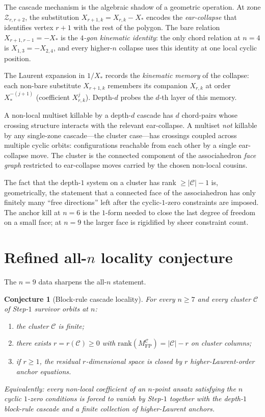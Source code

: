 \documentclass[11pt]{article}
\newtheorem{conj}[thm]{Conjecture}
\theoremstyle{definition}
\begin{document}
The cascade mechanism is the algebraic shadow of a geometric
operation. At zone $\mathcal Z_{r,r+2}$, the substitution
$X_{r+1,k}=X_{r,k}-X_*$ encodes the \emph{ear-collapse} that
identifies vertex $r{+}1$ with the rest of the polygon. The bare
relation $X_{r+1,r-1}=-X_*$ is the \emph{$4$-gon kinematic
identity}: the only chord relation at $n=4$ is $X_{1,3}=-X_{2,4}$,
and every higher-$n$ collapse uses this identity at one local
cyclic position.

The Laurent expansion in $1/X_*$ records the \emph{kinematic
memory} of the collapse: each non-bare substitute $X_{r+1,k}$
remembers its companion $X_{r,k}$ at order $X_*^{-(j+1)}$
(coefficient $X_{r,k}^{j}$). Depth-$d$ probes the $d$-th layer of
this memory.

A non-local multiset killable by a depth-$d$ cascade has $d$
chord-pairs whose crossing structure interacts with the relevant
ear-collapse. A multiset \emph{not} killable by any single-zone
cascade---the cluster case---has crossings coupled across multiple
cyclic orbits: configurations reachable from each other by a
single ear-collapse move. The cluster is the connected component
of the associahedron \emph{face graph} restricted to ear-collapse
moves carried by the chosen non-local cousins.

The fact that the depth-$1$ system on a cluster has rank
$\ge|\mathcal C|-1$ is, geometrically, the statement that a
connected face of the associahedron has only finitely many
``free directions'' left after the cyclic-$1$-zero constraints are
imposed. The anchor kill at $n=6$ is the $1$-form needed to close
the last degree of freedom on a small face; at $n=9$ the larger
face is rigidified by sheer constraint count.

\section{Refined all-$n$ locality conjecture}\label{sec:conj}

The $n=9$ data sharpens the all-$n$ statement.

\begin{conj}[Block-rule cascade locality]\label{conj:blockrule}
For every $n\ge 7$ and every cluster $\mathcal C$ of Step-$1$
survivor orbits at $n$:
\begin{enumerate}[label=\textup{(\arabic*)}]
\item the cluster $\mathcal C$ is finite;
\item there exists $r=r(\mathcal C)\ge 0$ with
$\mathrm{rank}(M_{\mathrm{FP}}^{\mathcal C})=|\mathcal C|-r$ on
cluster columns;
\item if $r\ge 1$, the residual $r$-dimensional space is closed
by $r$ higher-Laurent-order anchor equations.
\end{enumerate}
Equivalently: every non-local coefficient of an $n$-point ansatz
satisfying the $n$ cyclic $1$-zero conditions is forced to vanish
by Step-$1$ together with the depth-$1$ block-rule cascade and a
finite collection of higher-Laurent anchors.
\end{conj}
\end{document}
